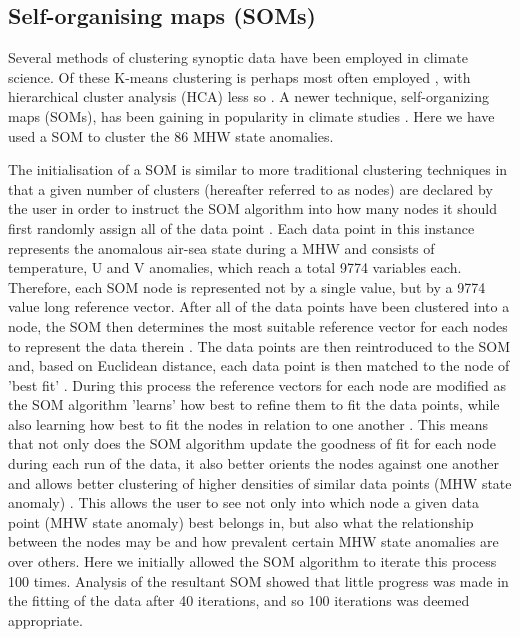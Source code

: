 \documentclass[a4paper,10pt,review]{elsarticle}
\begin{document}
\subsection{Self-organising maps (SOMs)}
Several methods of clustering synoptic data have been employed in climate science. Of these K-means clustering is perhaps most often employed \citep[e.g.][]{Corte-Real1998, Burrough2001, Kumar2011}, with hierarchical cluster analysis (HCA) less so \citep[e.g.][]{Unal2003}. A newer technique, self-organizing maps (SOMs), has been gaining in popularity in climate studies \citep[e.g.][]{Cavazos2000, Hewitson2002, Morioka2010}. Here we have used a SOM to cluster the 86 MHW state anomalies.

The initialisation of a SOM is similar to more traditional clustering techniques \citep[e.g.][]{Jain2010} in that a given number of clusters (hereafter referred to as nodes) are declared by the user in order to instruct the SOM algorithm into how many nodes it should first randomly assign all of the data point \citep{Hewitson2002}. Each data point in this instance represents the anomalous air-sea state during a MHW and consists of temperature, U and V anomalies, which reach a total 9774 variables each. Therefore, each SOM node is represented not by a single value, but by a 9774 value long reference vector. After all of the data points have been clustered into a node, the SOM then determines the most suitable reference vector for each nodes to represent the data therein \citep{Hewitson2002}. The data points are then reintroduced to the SOM and, based on Euclidean distance, each data point is then matched to the node of 'best fit' \citep{Hewitson2002}. During this process the reference vectors for each node are modified as the SOM algorithm 'learns' how best to refine them to fit the data points, while also learning how best to fit the nodes in relation to one another \citep{Hewitson2002}. This means that not only does the SOM algorithm update the goodness of fit for each node during each run of the data, it also better orients the nodes against one another and allows better clustering of higher densities of similar data points (MHW state anomaly) \citep{Hewitson2002}. This allows the user to see not only into which node a given data point (MHW state anomaly) best belongs in, but also what the relationship between the nodes may be and how prevalent certain MHW state anomalies are over others. Here we initially allowed the SOM algorithm to iterate this process 100 times. Analysis of the resultant SOM showed that little progress was made in the fitting of the data after 40 iterations, and so 100 iterations was deemed appropriate.
\end{document}
